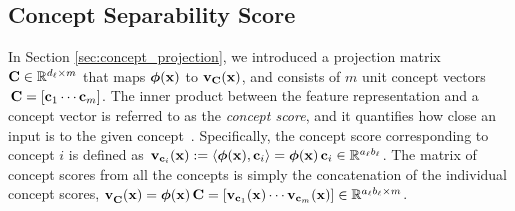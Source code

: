 \subsection{Concept Separability Score}
\label{sec:separability_score}
In Section \ref{sec:concept_projection}, we introduced a projection matrix $\mathbf{C} \in \mathbb{R}^{d_\ell \times m}$ that maps $\bm{\phi}(\mathbf{x})$ to $\mathbf{v}_{\mathbf{C}}(\mathbf{x})$, and consists of $m$ unit concept vectors $\,\mathbf{C} = [\mathbf{c}_1 \cdots \mathbf{c}_m]$. 
The inner product between the feature representation and a concept vector is referred to as the {\em concept score}, and it quantifies how close an input is to the given concept~\citep{kim2018tcav, ghorbani2019ace}.
%
Specifically, the concept score corresponding to concept $i$ is defined as $\,\mathbf{v}_{\mathbf{c}_i}(\mathbf{x}) := \langle \bm{\phi}(\mathbf{x}), \mathbf{c}_i \rangle = \bm{\phi}(\mathbf{x}) \,\mathbf{c}_i \in \mathbb{R}^{a_\ell b_\ell}$. 
%
%
The matrix of concept scores from all the concepts is simply the concatenation of the individual concept scores, \ie $\mathbf{v}^{}_{\mathbf{C}}(\mathbf{x}) = \bm{\phi}(\mathbf{x}) \,\mathbf{C} = [\mathbf{v}_{\mathbf{c}_1}(\mathbf{x}) \cdots \mathbf{v}_{\mathbf{c}_m}(\mathbf{x})] \in \mathbb{R}^{a_\ell b_\ell \times m}$.
